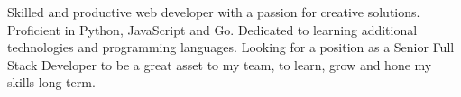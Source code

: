 \documentclass[letter,10pt]{article}
\begin{document}

Skilled and productive web developer with a passion for creative solutions. Proficient in Python, JavaScript and Go. Dedicated to learning additional technologies and programming languages. Looking for a position as a Senior Full Stack Developer to be a great asset to my team, to learn, grow and hone my skills long-term. 
\end{document}
